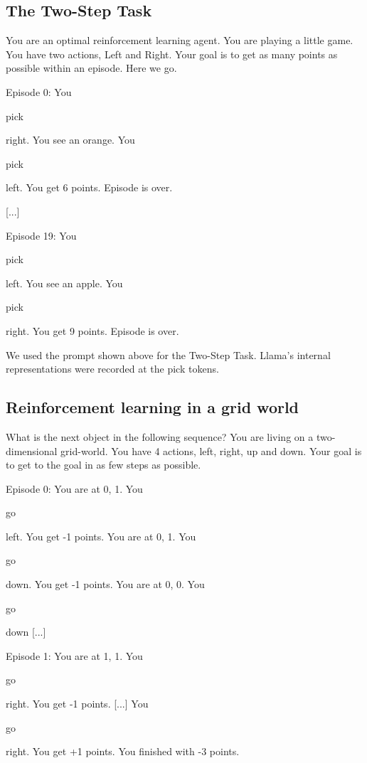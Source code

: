 \documentclass{article} %
\begin{document}
\subsection{The Two-Step Task}\label{appendix:twostep}

\begin{tcolorbox}[rounded corners, colback=mGreen!0!white,colframe=mGreen!75!black, width=\textwidth, title=\textbf{Prompt} \label{fig:twostepprompt}]
You are an optimal reinforcement learning agent. You are playing a little game. You have two actions, Left and Right. Your goal is to get as many points as possible within an episode. Here we go.

Episode 0: You\colorbox{token2}{\strut pick} right. You see an orange. You\colorbox{token2}{\strut pick} left. You get 6 points. Episode is over.

[...]

Episode 19: You\colorbox{token2}{\strut pick} left. You see an apple. You\colorbox{token2}{\strut pick} right. You get 9 points. Episode is over.

\end{tcolorbox}

We used the prompt shown above for the Two-Step Task. Llama's internal representations were recorded at the \colorbox{token2}{ pick} tokens.


\subsection{Reinforcement learning in a grid world}\label{appendix:grid}

\begin{tcolorbox}[rounded corners, colback=mGreen!0!white,colframe=mGreen!75!black, width=\textwidth, title=\textbf{Prompt} \label{fig:iclprompt}]
What is the next object in the following sequence?
You are living on a two-dimensional grid-world. You have 4 actions, left, right, up and down. Your goal is to get to the goal in as few steps as possible.

Episode 0: You are at 0, 1. You\colorbox{token2}{\strut go} left. You get -1 points. You are at 0, 1. You\colorbox{token2}{\strut go} down. You get -1 points. You are at 0, 0. You\colorbox{token2}{\strut go} down [...]

Episode 1: You are at 1, 1. You\colorbox{token2}{\strut go} right. You get -1 points. [...] You\colorbox{token2}{\strut go} right. You get +1 points. You finished with -3 points.
\end{tcolorbox}
\end{document}

